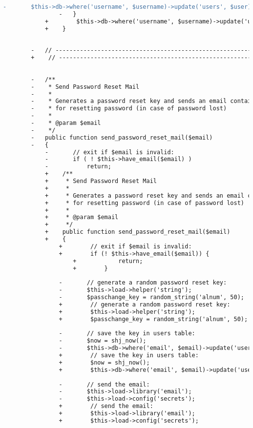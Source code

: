 \begin{lstlisting}[language=diff, caption=Perubahan pada kode User\_model.php]
				-		$this->db->where('username', $username)->update('users', $user);
				-	}
			+        $this->db->where('username', $username)->update('users', $user);
			+    }
		
		
		-	// ------------------------------------------------------------------------
		+    // ------------------------------------------------------------------------
		
		
		-	/**
		-	 * Send Password Reset Mail
		-	 *
		-	 * Generates a password reset key and sends an email containing the link
		-	 * for resetting password (in case of password lost)
		-	 *
		-	 * @param $email
		-	 */
		-	public function send_password_reset_mail($email)
		-	{
			-		// exit if $email is invalid:
			-		if ( ! $this->have_email($email) )
			-			return;
			+    /**
			+     * Send Password Reset Mail
			+     *
			+     * Generates a password reset key and sends an email containing the link
			+     * for resetting password (in case of password lost)
			+     *
			+     * @param $email
			+     */
			+    public function send_password_reset_mail($email)
			+    {
				+        // exit if $email is invalid:
				+        if (! $this->have_email($email)) {
					+            return;
					+        }
				
				-		// generate a random password reset key:
				-		$this->load->helper('string');
				-		$passchange_key = random_string('alnum', 50);
				+        // generate a random password reset key:
				+        $this->load->helper('string');
				+        $passchange_key = random_string('alnum', 50);
				
				-		// save the key in users table:
				-		$now = shj_now();
				-		$this->db->where('email', $email)->update('users', array('passchange_key'=>$passchange_key, 'passchange_time'=>date('Y-m-d H:i:s', $now)));
				+        // save the key in users table:
				+        $now = shj_now();
				+        $this->db->where('email', $email)->update('users', array('passchange_key' => $passchange_key, 'passchange_time' => date('Y-m-d H:i:s', $now)));
				
				-		// send the email:
				-		$this->load->library('email');
				-		$this->load->config('secrets');
				+        // send the email:
				+        $this->load->library('email');
				+        $this->load->config('secrets');
				

\end{lstlisting}
